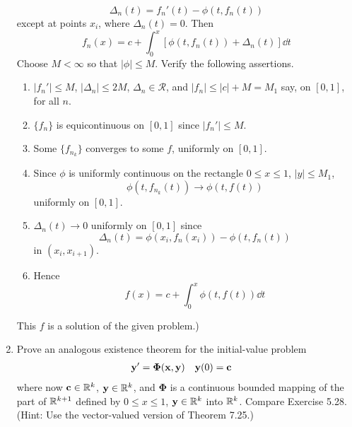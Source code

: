 \documentclass[../psets.tex]{subfiles}
\begin{document}
\begin{enumerate}[label={\textbf{\arabic*.}}]
    \begin{equation*}
        \Delta_n(t) = f_n'(t)-\phi(t,f_n(t))
    \end{equation*}
    except at points $x_i$, where $\Delta_n(t)=0$. Then
    \begin{equation*}
        f_n(x) = c+\int_0^x[\phi(t,f_n(t))+\Delta_n(t)]\dd{t}
    \end{equation*}
    Choose $M<\infty$ so that $|\phi|\leq M$. Verify the following assertions.
    \begin{enumerate}
        \item $|f_n'|\leq M$, $|\Delta_n|\leq 2M$, $\Delta_n\in\mathscr{R}$, and $|f_n|\leq|c|+M=M_1$ say, on $[0,1]$, for all $n$.
        \item $\{f_n\}$ is equicontinuous on $[0,1]$ since $|f_n'|\leq M$.
        \item Some $\{f_{n_k}\}$ converges to some $f$, uniformly on $[0,1]$.
        \item Since $\phi$ is uniformly continuous on the rectangle $0\leq x\leq 1$, $|y|\leq M_1$,
        \begin{equation*}
            \phi(t,f_{n_k}(t)) \to \phi(t,f(t))
        \end{equation*}
        uniformly on $[0,1]$.
        \item $\Delta_n(t)\to 0$ uniformly on $[0,1]$ since
        \begin{equation*}
            \Delta_n(t) = \phi(x_i,f_n(x_i))-\phi(t,f_n(t))
        \end{equation*}
        in $(x_i,x_{i+1})$.
        \item Hence
        \begin{equation*}
            f(x) = c+\int_0^x\phi(t,f(t))\dd{t}
        \end{equation*}
    \end{enumerate}
    This $f$ is a solution of the given problem.)
    \item Prove an analogous existence theorem for the initial-value problem
    \begin{align*}
        \mathbf{y}' &= \bm{\Phi}(\mathbf{x},\mathbf{y})&
        \mathbf{y}(0) &= \mathbf{c}
    \end{align*}
    where now $\mathbf{c}\in\mathbb{R}^k$, $\mathbf{y}\in\mathbb{R}^k$, and $\bm{\Phi}$ is a continuous bounded mapping of the part of $\mathbb{R}^{k+1}$ defined by $0\leq x\leq 1$, $\mathbf{y}\in\mathbb{R}^k$ into $\mathbb{R}^k$. Compare Exercise 5.28. (Hint: Use the vector-valued version of Theorem 7.25.)
\end{enumerate}
\end{document}
